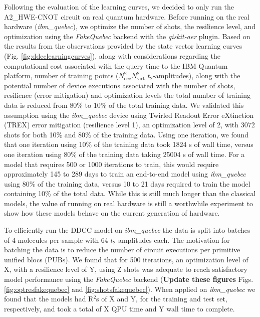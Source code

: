 \documentclass[journal=jacsat,manuscript=article]{achemso}
\begin{document}
Following the evaluation of the learning curves, we decided to only run the A2{\_}HWE-CNOT circuit on real quantum hardware.
Before running on the real hardware (\textit{ibm{\_}quebec}), we optimize the number of shots, the resilience level, and optimization using the \textit{FakeQuebec} backend with the \textit{qiskit-aer} plugin.
Based on the results from the observations provided by the state vector learning curves (Fig. \ref{fig:ddcclearningcurves}), along with considerations regarding the computational cost associated with the query time to the IBM Quantum platform, number of training points ($N_{\text{occ}}^{2}N_{\text{virt}}^{2}$ $t_{2}$-amplitudes), along with the potential number of device executions associated with the number of shots, resilience (error mitigation) and optimization levels the total number of training data is reduced from 80\% to 10\% of the total training data.
We validated this assumption using the \textit{ibm{\_}quebec} device using Twirled Readout Error eXtinction (TREX) \cite{van_den_berg_model-free_2022} error mitigation (resilience level 1), an optimization level of 2, with 3072 shots for both 10\%  and 80\% of the training data.
Using one iteration, we found that one iteration using 10\% of the training data took 1824 s of wall time, versus one iteration using 80\% of the training data taking 25004 s of wall time.
For a model that requires 500 or 1000 iterations to train, this would require approximately 145 to 289 days to train an end-to-end model using \textit{ibm{\_}quebec} using 80\% of the training data, versus 10 to 21 days required to train the model containing 10\% of the total data.
While this is still much longer than the classical models, the value of running on real hardware is still a worthwhile experiment to show how these models behave on the current generation of hardware.
 


To efficiently run the DDCC model on \textit{ibm{\_}quebec} the data is split into batches of 4 molecules per sample with 64 $t_{2}$-amplitudes each.
The motivation for batching the data is to reduce the number of circuit executions per primitive unified blocs (PUBs).
We found that for 500 iterations, an optimization level of X, with a resilience level of Y, using Z shots was adequate to reach satisfactory model performance using the \textit{FakeQuebec} backend (\textbf{Update these figures} Figs. \ref{fig:optresfakequebec} and \ref{fig:shotsfakequebec}).
When applied on \textit{ibm{\_}quebec} we found that the models had R$^{2}$s of X and Y, for the training and test set, respectively, and took a total of X QPU time and Y wall time to complete.
\end{document}
